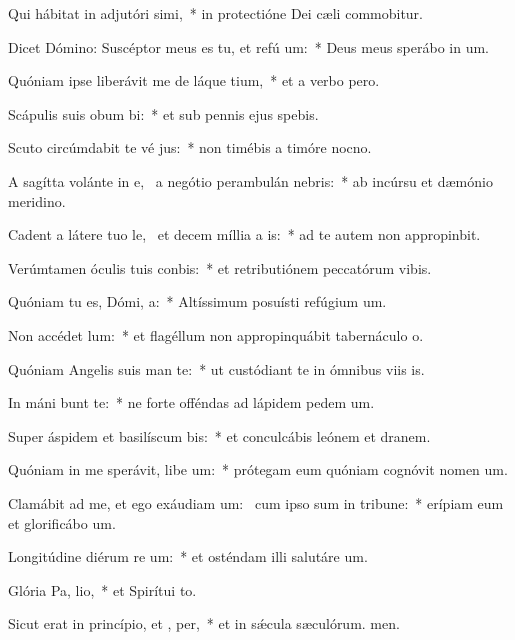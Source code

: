 \item Qui hábitat in adjutóri simi,~* in protectióne Dei cæli commobitur.
\item Dicet Dómino: Suscéptor meus es tu, et refú um:~* Deus meus sperábo in um.
\item Quóniam ipse liberávit me de láque tium,~* et a verbo pero.
\item Scápulis suis obum bi:~* et sub pennis ejus spebis.
\item Scuto circúmdabit te vé jus:~* non timébis a timóre nocno.
\item A sagítta volánte in e,~\pscross{} a negótio perambulán  nebris:~* ab incúrsu et dæmónio meridino.
\item Cadent a látere tuo le,~\pscross{} et decem míllia a  is:~* ad te autem non appropinbit.
\item Verúmtamen óculis tuis conbis:~* et retributiónem peccatórum vibis.
\item Quóniam tu es, Dómi,  a:~* Altíssimum posuísti refúgium um.
\item Non accédet   lum:~* et flagéllum non appropinquábit tabernáculo o.
\item Quóniam Angelis suis man  te:~* ut custódiant te in ómnibus viis is.
\item In máni bunt te:~* ne forte offéndas ad lápidem pedem um.
\item Super áspidem et basilíscum bis:~* et conculcábis leónem et dranem.
\item Quóniam in me sperávit, libe um:~* prótegam eum quóniam cognóvit nomen um.
\item Clamábit ad me, et ego exáudiam um:~\pscross{} cum ipso sum in tribune:~* erípiam eum et glorificábo um.
\item Longitúdine diérum re um:~* et osténdam illi salutáre um.
\item Glória Pa,  lio,~* et Spirítui to.
\item Sicut erat in princípio, et ,  per,~* et in sǽcula sæculórum. men.
